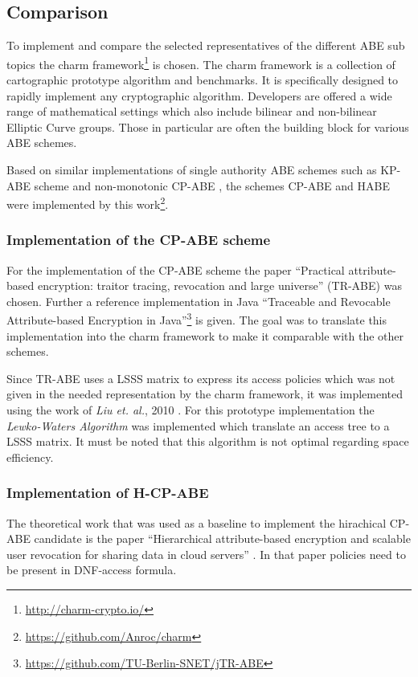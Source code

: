 \subsection{Comparison}
To implement and compare the selected representatives of the different ABE sub topics the charm framework\footnote{\url{http://charm-crypto.io/}} is chosen. The charm framework is a collection of cartographic prototype algorithm and benchmarks. It is specifically designed to rapidly implement any cryptographic algorithm. Developers are offered a wide range of mathematical settings which also include bilinear and non-bilinear Elliptic Curve groups. Those in particular are often the building block for various ABE schemes. 

Based on similar implementations of single authority ABE schemes such as \ac{KP-ABE} scheme \cite{lewko2010revocation} and non-monotonic \ac{CP-ABE} \cite{10.1007/978-3-642-54631-0_16}, the schemes \ac{CP-ABE} \cite{liu2016practical} and HABE \cite{wang2011hierarchical} were implemented  by this work\footnote{\url{https://github.com/Anroc/charm}}. 

\subsubsection{Implementation of the CP-ABE scheme}
For the implementation of the CP-ABE scheme the paper “Practical attribute-based encryption: traitor tracing, revocation and large universe” \cite{liu2016practical} (\ac{TR-ABE}) was chosen. Further a reference implementation in Java “Traceable and Revocable Attribute-based Encryption in Java”\footnote{\url{https://github.com/TU-Berlin-SNET/jTR-ABE}} is given. The goal was to translate this implementation into the charm framework to make it comparable with the other schemes. 

Since TR-ABE uses a LSSS matrix to express its access policies which was not given in the needed representation by the charm framework, it was implemented using the work of \textit{Liu et. al.}, 2010  \cite{liu2010efficient}. For this prototype implementation the \textit{Lewko-Waters Algorithm} was implemented which translate an access tree to a LSSS matrix. It must be noted that this algorithm is not optimal regarding space efficiency. 

\subsubsection{Implementation of H-CP-ABE}
The theoretical work that was used as a baseline to implement the hirachical CP-ABE candidate is the paper “Hierarchical attribute-based encryption and scalable user revocation for sharing data in cloud servers” \cite{wang2011hierarchical}. In that paper policies need to be present in DNF-access formula. 

